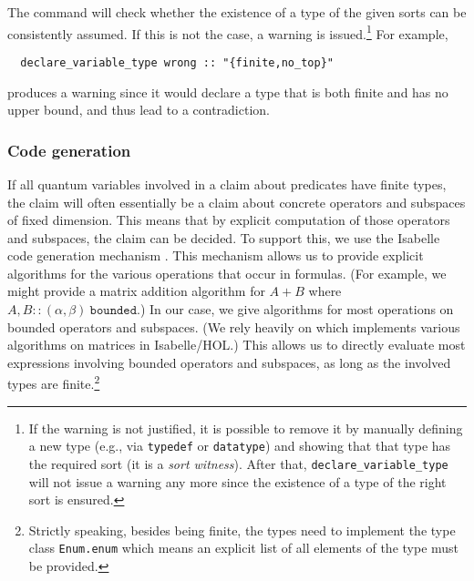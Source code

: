 \documentclass{article}
\begin{document}
The command will check whether the existence of a type of the given
sorts can be consistently assumed.  If this is not the case, a warning
is issued.\footnote{If the warning is not justified, it is possible to
  remove it by manually defining a new type (e.g., via
  \texttt{typedef} or \texttt{datatype}) and showing that that type
  has the required sort (it is a \emph{sort witness}). After that,
  \texttt{declare\_variable\_type} will not issue a warning any more
  since the existence of a type of the right sort is ensured.}  For
example,
\begin{lstlisting}
  declare_variable_type wrong :: "{finite,no_top}"
\end{lstlisting}
produces a warning since it would declare a type that is both finite
and has no upper bound, and thus lead to a contradiction.



\subsubsection{Code generation}
If all quantum variables involved in a
claim about predicates have finite types, the claim will often
essentially be a claim about concrete operators and subspaces of fixed
dimension. This means that by explicit computation of those operators and
subspaces, the claim can be decided. To support this, we use the
Isabelle code generation mechanism 
\cite{isabelle-codegen}. This mechanism allows us to provide explicit
algorithms for the various operations that occur in formulas. (For
example, we might provide a matrix addition algorithm for $A+B$
where $A,B::(\alpha,\beta)\ \mathtt{bounded}$.)
In our case, we give algorithms for most operations on bounded
operators and subspaces. (We rely heavily on \cite{Jordan_Normal_Form-AFP} which
implements various algorithms on matrices in Isabelle/HOL.) This
allows us to directly evaluate most expressions involving bounded
operators and subspaces, as long as the involved types are
finite.\footnote{Strictly speaking, besides being finite, the types need to implement the
  type class \texttt{Enum.enum} which means an explicit list of all
  elements of the type must be provided.}
\end{document}
